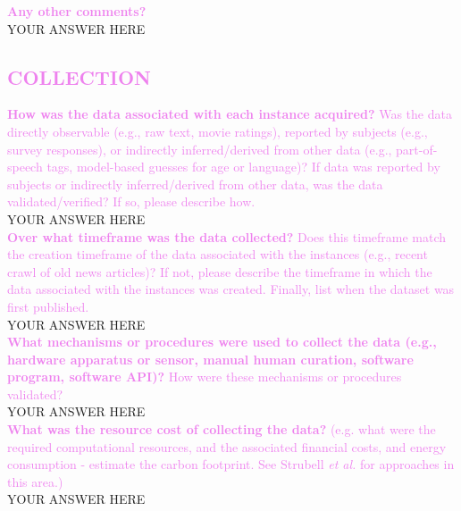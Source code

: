 \documentclass[letterpaper, 10 pt, conference]{ieeeconf}
\newcommand{\sectioncolor}{violet}
\begin{document}
    \textcolor{\sectioncolor}{\textbf{
    Any other comments?
    }} \\
    YOUR ANSWER HERE \\

\begin{mdframed}[linecolor=\sectioncolor]
\section*{\textcolor{\sectioncolor}{
    COLLECTION
}}
\end{mdframed}

    \textcolor{\sectioncolor}{\textbf{
    How was the data associated with each instance acquired?
    }
    Was the data directly observable (e.g., raw text, movie ratings),
    reported by subjects (e.g., survey responses), or indirectly
    inferred/derived from other data (e.g., part-of-speech tags, model-based
    guesses for age or language)? If data was reported by subjects or
    indirectly inferred/derived from other data, was the data
    validated/verified? If so, please describe how.
    } \\
    YOUR ANSWER HERE \\
    
    \textcolor{\sectioncolor}{\textbf{
    Over what timeframe was the data collected?
    }
    Does this timeframe match the creation timeframe of the data associated
    with the instances (e.g., recent crawl of old news articles)? If not,
    please describe the timeframe in which the data associated with the
    instances was created. Finally, list when the dataset was first published.
    } \\
    YOUR ANSWER HERE \\
    
    \textcolor{\sectioncolor}{\textbf{
    What mechanisms or procedures were used to collect the data (e.g., hardware
    apparatus or sensor, manual human curation, software program, software
    API)?
    }
    How were these mechanisms or procedures validated?
    } \\
    YOUR ANSWER HERE \\
    
    \textcolor{\sectioncolor}{\textbf{
    What was the resource cost of collecting the data?
    }
    (e.g. what were the required computational resources, and the associated
    financial costs, and energy consumption - estimate the carbon footprint.
    See Strubell \textit{et al.}\cite{strubellEnergyPolicyConsiderations2019} for approaches in this area.)
    } \\
    YOUR ANSWER HERE \\
    
\end{document}
